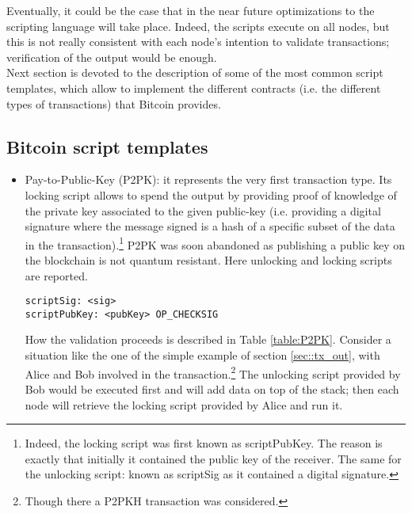 Eventually, it could be the case that in the near future optimizations to the scripting language will take place. Indeed, the scripts execute on all nodes, but this is not really consistent with each node's intention to validate transactions; verification of the output would be enough.\\
Next section is devoted to the description of some of the most common script templates, which allow to implement the different contracts (i.e. the different types of transactions) that Bitcoin provides. 

\subsection{Bitcoin script templates}
\label{sec::script_templ}
\begin{itemize}[leftmargin=*]
\item Pay-to-Public-Key (P2PK): it represents the very first transaction type. Its locking script allows to spend the output by providing proof of knowledge of the private key associated to the given public-key (i.e. providing a digital signature where the message signed is a hash of a specific subset of the data in the transaction).\footnote{Indeed, the locking script was first known as scriptPubKey. The reason is exactly that initially it contained the public key of the receiver. The same for the unlocking script: known as scriptSig as it contained a digital signature.} P2PK was soon abandoned as publishing a public key on the blockchain is not quantum resistant. Here unlocking and locking scripts are reported.
\begin{lstlisting}[frame=single]
scriptSig: <sig>
scriptPubKey: <pubKey> OP_CHECKSIG
\end{lstlisting}
How the validation proceeds is described in Table \ref{table:P2PK}. Consider a situation like the one of the simple example of section \ref{sec::tx_out}, with Alice and Bob involved in the transaction.\footnote{Though there a P2PKH transaction was considered.} The unlocking script provided by Bob would be executed first and will add data on top of the stack; then each node will retrieve the locking script provided by Alice and run it.
\begin{center}
	\noindent
\end{center}
\end{itemize}
